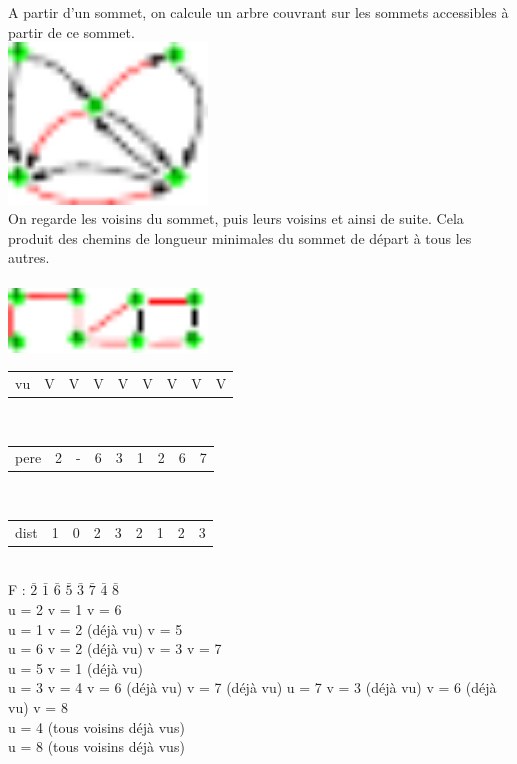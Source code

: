  A partir d'un sommet, on calcule un arbre couvrant sur les sommets accessibles à partir de ce sommet. \\
\includegraphics[width=200px]{Images/fig9.pdf}\\

 On regarde les voisins du sommet, puis leurs voisins et ainsi de suite. Cela produit des chemins de longueur minimales du sommet de départ à tous les autres. \\

 \\
\includegraphics[width=200px]{Images/fig10.pdf}\\
\begin{tabular}{l|l|l|l|l|l|l|l|l}
 vu & V & V & V & V & V & V & V & V
\end{tabular} \\

\begin{tabular}{l|l|l|l|l|l|l|l|l}
 pere & 2 & - & 6 & 3 & 1 & 2 & 6 & 7
\end{tabular} \\

\begin{tabular}{l|l|l|l|l|l|l|l|l}
 dist & 1 & 0 & 2 & 3 & 2 & 1 & 2 & 3
\end{tabular} \\

F : $\bar{2}$ $\bar{1}$ $\bar{6}$ $\bar{5}$ $\bar{3}$ $\bar{7}$ $\bar{4}$ $\bar{8}$ \\
u = 2 
v = 1 
v = 6 \\
u = 1 
v = 2 (déjà vu) 
v = 5 \\
u = 6 
v = 2 (déjà vu) 
v = 3 
v = 7 \\
u = 5 
v = 1 (déjà vu) \\
u = 3 
v = 4 
v = 6 (déjà vu) 
v = 7 (déjà vu) 
u = 7 
v = 3 (déjà vu) 
v = 6 (déjà vu) 
v = 8 \\
u = 4 (tous voisins déjà vus) \\
u = 8 (tous voisins déjà vus) \\

